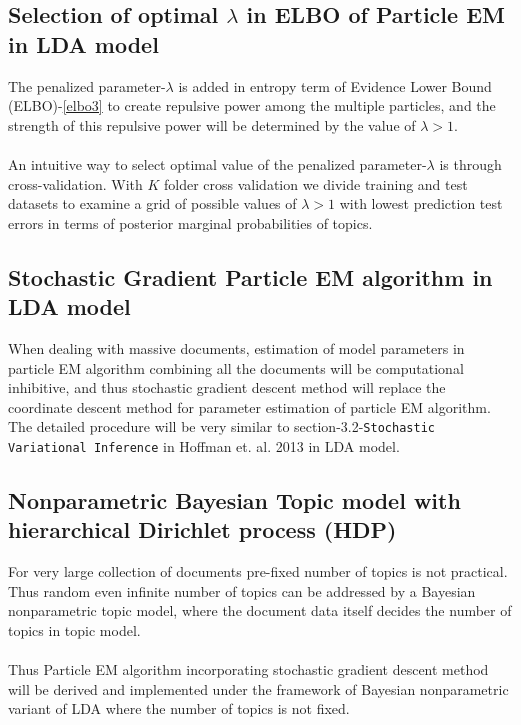 \documentclass{article}
\begin{document}
\subsection{Selection of optimal $\lambda$ in ELBO of Particle EM in LDA model}
The penalized parameter-$\lambda$ is added in entropy term of Evidence Lower Bound (ELBO)-\ref{elbo3} to create repulsive power among the multiple particles, and the strength of this repulsive power will be determined by the value of $\lambda>1$.\\
\\
An intuitive way to select optimal value of the penalized parameter-$\lambda$ is through cross-validation. With $K$ folder cross validation we divide training and test datasets to examine a grid of possible values of $\lambda>1$ with lowest prediction test errors in terms of posterior marginal probabilities of topics.
\subsection{Stochastic Gradient Particle EM algorithm in LDA model}
When dealing with massive documents,  estimation of model parameters in particle EM algorithm combining all the documents will be computational inhibitive, and thus stochastic gradient descent method will replace the coordinate descent method for parameter estimation of particle EM algorithm.
The detailed procedure will be very similar to section-3.2-\texttt{Stochastic Variational Inference} in Hoffman et. al. 2013 in LDA model.
\subsection{Nonparametric Bayesian Topic model with hierarchical Dirichlet process (HDP)}
For very large collection of documents pre-fixed number of topics is not practical. Thus random  even infinite number of topics can be addressed by a Bayesian nonparametric topic model, where the document data itself decides the number of topics in topic model.\\
\\
Thus Particle EM algorithm incorporating stochastic gradient descent method will be derived and implemented under the framework of Bayesian nonparametric variant of LDA where the number of topics is not fixed.  
\end{document}
